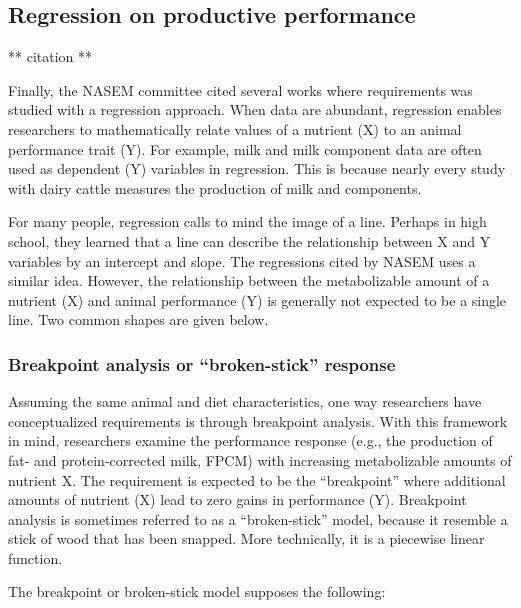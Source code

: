 \documentclass[
]{book}
\begin{document}
\hypertarget{regression-on-productive-performance}{%
\subsection{Regression on productive performance}\label{regression-on-productive-performance}}

** citation **

Finally, the NASEM \citeyearpar{NASEM8} committee cited several works where requirements was studied with a regression approach. When data are abundant, regression enables researchers to mathematically relate values of a nutrient (X) to an animal performance trait (Y). For example, milk and milk component data are often used as dependent (Y) variables in regression. This is because nearly every study with dairy cattle measures the production of milk and components.

For many people, regression calls to mind the image of a line. Perhaps in high school, they learned that a line can describe the relationship between X and Y variables by an intercept and slope. The regressions cited by NASEM \citeyearpar{NASEM8} uses a similar idea. However, the relationship between the metabolizable amount of a nutrient (X) and animal performance (Y) is generally not expected to be a single line. Two common shapes are given below.

\hypertarget{breakpoint-analysis-or-broken-stick-response}{%
\subsubsection{Breakpoint analysis or ``broken-stick'' response}\label{breakpoint-analysis-or-broken-stick-response}}

\citet{Robbins2006}

Assuming the same animal and diet characteristics, one way researchers have conceptualized requirements is through breakpoint analysis. With this framework in mind, researchers examine the performance response (e.g., the production of fat- and protein-corrected milk, FPCM) with increasing metabolizable amounts of nutrient X. The requirement is expected to be the ``breakpoint'' where additional amounts of nutrient (X) lead to zero gains in performance (Y). Breakpoint analysis is sometimes referred to as a ``broken-stick'' model, because it resemble a stick of wood that has been snapped. More technically, it is a piecewise linear function.

The breakpoint or broken-stick model supposes the following:
\end{document}
